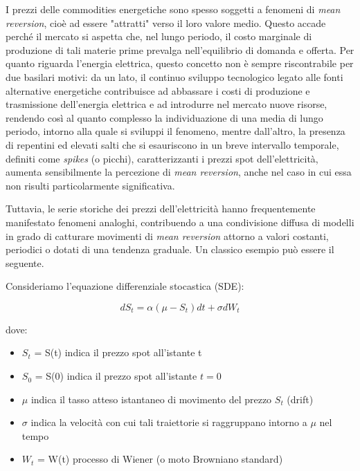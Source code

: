\documentclass[12pt,a4paper]{report}
\begin{document}
I prezzi delle commodities energetiche sono spesso soggetti a fenomeni di \textit{mean reversion}, cioè ad essere "attratti" verso il loro valore medio. Questo accade perché il mercato si aspetta che, nel lungo periodo, il costo marginale di produzione di tali materie prime prevalga nell'equilibrio di domanda e offerta.
Per quanto riguarda l'energia elettrica, questo concetto non è sempre riscontrabile per due basilari motivi: da un lato, il continuo sviluppo tecnologico legato alle fonti alternative energetiche contribuisce ad abbassare i costi di produzione e trasmissione dell'energia elettrica e ad introdurre nel mercato nuove risorse, rendendo così al quanto complesso la individuazione di una media di lungo periodo, intorno alla quale si sviluppi il fenomeno, mentre dall'altro, la presenza di repentini ed elevati salti che si esauriscono in un breve intervallo temporale, definiti come \textit{spikes} (o picchi), caratterizzanti i prezzi spot dell'elettricità, aumenta sensibilmente la percezione di \textit{mean reversion}, anche nel caso in cui essa non risulti particolarmente significativa.

Tuttavia, le serie storiche dei prezzi dell'elettricità hanno frequentemente manifestato fenomeni analoghi, contribuendo a una condivisione diffusa di modelli in grado di catturare movimenti di \textit{mean reversion} attorno a valori costanti, periodici o dotati di una tendenza graduale. Un classico esempio può essere il seguente.

Consideriamo l'equazione differenziale stocastica (SDE):

\begin{equation}
    dS_t = \alpha (\mu - S_t)dt + \sigma dW_t \label{eq:OU}
\end{equation}

dove:
\begin{itemize}
    \item $S_t$ = S(t) indica il prezzo spot all'istante t
    \item $S_0$ = S(0) indica il prezzo spot all'istante $t=0$
    \item $\mu$ indica il tasso atteso istantaneo di movimento del prezzo $S_t$ (drift)
    \item $\sigma$ indica la velocità con cui tali traiettorie si raggruppano intorno a $\mu$ nel tempo
    \item $W_t$ = W(t) processo di Wiener (o moto Browniano standard)
\end{itemize}
\end{document}
